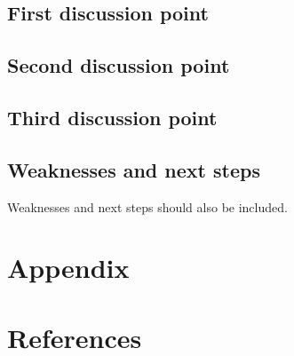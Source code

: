 \documentclass[
  letterpaper,
  DIV=11,
  numbers=noendperiod]{scrartcl}
\begin{document}
\hypertarget{sec-first-point}{%
\subsection{First discussion point}\label{sec-first-point}}

\hypertarget{second-discussion-point}{%
\subsection{Second discussion point}\label{second-discussion-point}}

\hypertarget{third-discussion-point}{%
\subsection{Third discussion point}\label{third-discussion-point}}

\hypertarget{weaknesses-and-next-steps}{%
\subsection{Weaknesses and next steps}\label{weaknesses-and-next-steps}}

Weaknesses and next steps should also be included.

\newpage

\appendix

\hypertarget{appendix}{%
\section*{Appendix}\label{appendix}}

\newpage

\hypertarget{references}{%
\section*{References}\label{references}}
\end{document}
